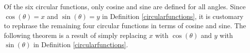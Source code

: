 Of the six circular functions, only cosine and sine are defined for all angles.  Since $\cos(\theta) = x$ and $\sin(\theta) = y$ in Definition \ref{circularfunctions}, it is customary to rephrase the remaining four circular functions in terms of cosine and sine.  The following theorem is a result of simply replacing $x$ with $\cos(\theta)$ and $y$ with $\sin(\theta)$ in Definition \ref{circularfunctions}.

\smallskip


\medskip

